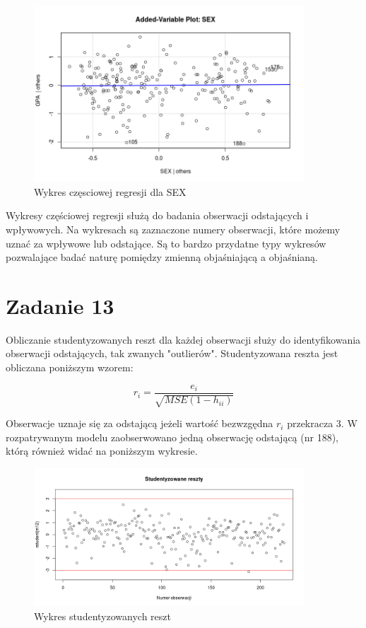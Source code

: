\documentclass[9pt]{article}  %
\begin{document}
    
    \begin{figure}[H]
      \centering
      \includegraphics[width=0.9\textwidth]{126.png}
      \caption{Wykres częsciowej regresji dla SEX}
    \end{figure}

Wykresy częściowej regresji służą do badania obserwacji odstających i wpływowych. Na wykresach są zaznaczone numery obserwacji, które możemy uznać za wpływowe lub odstające. Są to bardzo przydatne typy wykresów pozwalające badać naturę pomiędzy zmienną objaśniającą a objaśnianą.


\section{Zadanie 13}

Obliczanie studentyzowanych reszt dla każdej obserwacji służy do identyfikowania obserwacji odstających, tak zwanych "outlierów". Studentyzowana reszta jest obliczana poniższym wzorem:

$$r_i = \frac{e_i}{ \sqrt{MSE(1-h_{ii})} }$$

Obserwacje uznaje się za odstającą jeżeli wartość bezwzgędna $r_i$ przekracza 3. W rozpatrywanym modelu zaobserwowano jedną obserwację odstającą (nr 188), którą również widać na poniższym wykresie.

    \begin{figure}[H]
      \centering
      \includegraphics[width=0.9\textwidth]{13.png}
      \caption{Wykres studentyzowanych reszt}
    \end{figure} 
\end{document}
